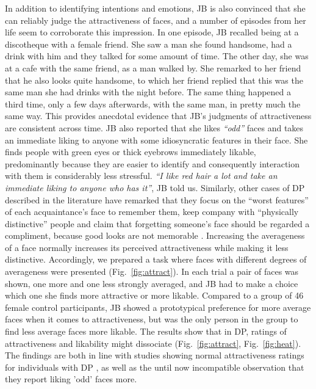 \documentclass[fleqn,10pt]{SelfArx} %
\begin{document}
In addition to identifying intentions and emotions, JB is also convinced that she can reliably judge the attractiveness of faces, and a number of episodes from her life seem to corroborate this impression.
In one episode, JB recalled being at a discotheque with a female friend. She saw a man she found handsome, had a drink with him and they talked for some amount of time. The other day, she was at a cafe with the same friend, as a man walked by. She remarked to her friend that he also looks quite handsome, to which her friend replied that this was the same man she had drinks with the night before. The same thing happened a third time, only a few days afterwards, with the same man, in pretty much the same way. This provides anecdotal evidence that JB's judgments of attractiveness are consistent across time.
JB also reported that she likes \textit{“odd”} faces and takes an immediate liking to anyone with some idiosyncratic features in their face. She finds people with green eyes or thick eyebrows immediately likable, predominantly because they are easier to identify and consequently interaction with them is considerably less stressful. \textit{“I like red hair a lot and take an immediate liking to anyone who has it”}, JB told us. Similarly, other cases of DP described in the literature have remarked that they focus on the “worst features” of each acquaintance's face to remember them, keep company with “physically distinctive” people and claim that forgetting someone's face should be regarded a compliment, because good looks are not memorable \citep{Fine_2012}.
Increasing the averageness of a face normally increases its perceived attractiveness \citep{Little_2011} while making it less distinctive. Accordingly, we prepared a task where faces with different degrees of averageness were presented (Fig.~\ref{fig:attract}). In each trial a pair of faces was shown, one more and one less strongly averaged, and JB had to make a choice which one she finds more attractive or more likable. Compared to a group of 46 female control participants, JB showed a prototypical preference for more average faces when it comes to attractiveness, but was the only person in the group to find less average faces more likable. The results show that in DP, ratings of attractiveness and likability might dissociate (Fig.~\ref{fig:attract}, Fig.~\ref{fig:heat}). The findings are both in line with studies showing normal attractiveness ratings for individuals with DP \citep{Carbon_2010}, as well as the until now incompatible observation that they report liking 'odd' faces more.
\end{document}
